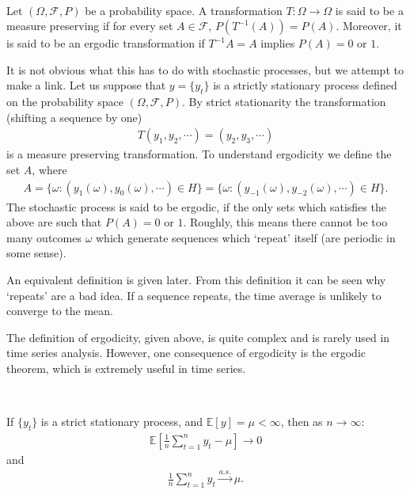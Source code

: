 \begin{definition}\label{def:ergodicity}
    \

    Let $(\Omega, \mathcal{F}, P)$ be a probability space.
    A transformation $T: \Omega \to \Omega$ is said to be a measure preserving
    if for every set $A \in \mathcal{F}$, $P(T^{-1}(A)) = P(A)$.
    Moreover, it is said to be an ergodic transformation if $T^{-1} A = A$ implies $P(A)=0$ or $1$.

    It is not obvious what this has to do with stochastic processes, but we attempt to make a link.
    Let us suppose that $y = \{y_t\}$ is a strictly stationary process defined on the probability space $(\Omega, \mathcal{F}, P)$.
    By strict stationarity the transformation (shifting a sequence by one)
    \begin{gather*}
        T(y_1, y_2, \cdots) = (y_2, y_3, \cdots)
    \end{gather*}
    is a measure preserving transformation. 
    To understand ergodicity we define the set $A$, where
    \begin{gather*}
        A = \{\omega: \left( y_1(\omega), y_0(\omega), \cdots \right) \in H \} = \{ \omega: \left( y_{-1}(\omega), y_{-2}(\omega), \cdots \right) \in H \}.
    \end{gather*}
    The stochastic process is said to be ergodic, 
    if the only sets which satisfies the above are such that $P(A) = 0$ or $1$.
    Roughly, this means there cannot be too many outcomes $\omega$ which generate sequences which `repeat' itself (are periodic in some sense).

    An equivalent definition is given later. From this definition it can be seen why `repeats' are a bad idea. 
    If a sequence repeats, the time average is unlikely to converge to the mean.
\end{definition}

The definition of ergodicity, given above, is quite complex and is rarely used in time series analysis.
However, one consequence of ergodicity is the ergodic theorem, which is extremely useful in time
series.

\begin{theorem}\label{thm:ergodic-theorem}
    \

    If $\{y_t\}$ is a strict stationary process, and $\mathbb{E}[y] = \mu < \infty$, then as $n \to \infty$:
    \begin{gather*}
        \mathbb{E}\left[ \frac{1}{n} \sum_{t=1}^{n} y_t - \mu \right] \to 0
    \end{gather*}
    and
    \begin{gather*}
        \frac{1}{n} \sum_{t=1}^{n} y_t \xrightarrow{a.s.} \mu.
    \end{gather*} 
\end{theorem}

